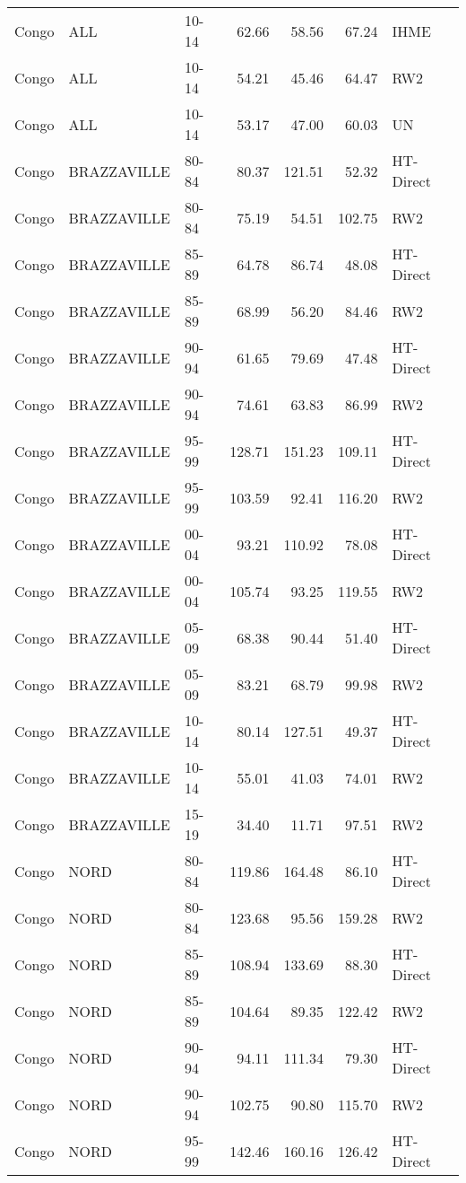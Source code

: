 \begin{longtable}{lllrrrl}
  Congo & ALL & 10-14 & 62.66 & 58.56 & 67.24 & IHME \\ 
  Congo & ALL & 10-14 & 54.21 & 45.46 & 64.47 & RW2 \\ 
  Congo & ALL & 10-14 & 53.17 & 47.00 & 60.03 & UN \\ 
  Congo & BRAZZAVILLE & 80-84 & 80.37 & 121.51 & 52.32 & HT-Direct \\ 
  Congo & BRAZZAVILLE & 80-84 & 75.19 & 54.51 & 102.75 & RW2 \\ 
  Congo & BRAZZAVILLE & 85-89 & 64.78 & 86.74 & 48.08 & HT-Direct \\ 
  Congo & BRAZZAVILLE & 85-89 & 68.99 & 56.20 & 84.46 & RW2 \\ 
  Congo & BRAZZAVILLE & 90-94 & 61.65 & 79.69 & 47.48 & HT-Direct \\ 
  Congo & BRAZZAVILLE & 90-94 & 74.61 & 63.83 & 86.99 & RW2 \\ 
  Congo & BRAZZAVILLE & 95-99 & 128.71 & 151.23 & 109.11 & HT-Direct \\ 
  Congo & BRAZZAVILLE & 95-99 & 103.59 & 92.41 & 116.20 & RW2 \\ 
  Congo & BRAZZAVILLE & 00-04 & 93.21 & 110.92 & 78.08 & HT-Direct \\ 
  Congo & BRAZZAVILLE & 00-04 & 105.74 & 93.25 & 119.55 & RW2 \\ 
  Congo & BRAZZAVILLE & 05-09 & 68.38 & 90.44 & 51.40 & HT-Direct \\ 
  Congo & BRAZZAVILLE & 05-09 & 83.21 & 68.79 & 99.98 & RW2 \\ 
  Congo & BRAZZAVILLE & 10-14 & 80.14 & 127.51 & 49.37 & HT-Direct \\ 
  Congo & BRAZZAVILLE & 10-14 & 55.01 & 41.03 & 74.01 & RW2 \\ 
  Congo & BRAZZAVILLE & 15-19 & 34.40 & 11.71 & 97.51 & RW2 \\ 
  Congo & NORD & 80-84 & 119.86 & 164.48 & 86.10 & HT-Direct \\ 
  Congo & NORD & 80-84 & 123.68 & 95.56 & 159.28 & RW2 \\ 
  Congo & NORD & 85-89 & 108.94 & 133.69 & 88.30 & HT-Direct \\ 
  Congo & NORD & 85-89 & 104.64 & 89.35 & 122.42 & RW2 \\ 
  Congo & NORD & 90-94 & 94.11 & 111.34 & 79.30 & HT-Direct \\ 
  Congo & NORD & 90-94 & 102.75 & 90.80 & 115.70 & RW2 \\ 
  Congo & NORD & 95-99 & 142.46 & 160.16 & 126.42 & HT-Direct \\ 

\end{longtable}
